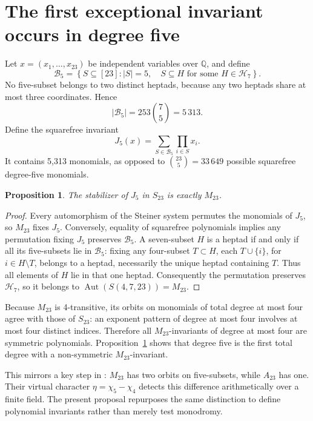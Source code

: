 \documentclass[11pt,letterpaper]{article}
\newtheorem{proposition}[theorem]{Proposition}
\theoremstyle{definition}
\newcommand{\QQ}{\mathbb{Q}}
\newcommand{\Aut}{\operatorname{Aut}}
\newcommand{\B}{\mathcal{B}_5}
\newcommand{\oct}{\mathcal{H}_7}
\begin{document}
\section{The first exceptional invariant occurs in degree five}\label{sec:five}
Let \(x=(x_1,\ldots,x_{23})\) be independent variables over \(\QQ\), and define
\[
\B=\left\{S\subseteq[23]: |S|=5,\quad S\subseteq H\text{ for some }H\in\oct\right\}.
\]
No five-subset belongs to two distinct heptads, because any two heptads share at most three coordinates. Hence
\[
|\B|=253\binom75=5\,313.
\]
Define the squarefree invariant
\begin{equation}\label{eq:J5}
\boxed{\displaystyle J_5(x)=\sum_{S\in\B}\prod_{i\in S}x_i.}
\end{equation}
It contains 5,313 monomials, as opposed to \(\binom{23}{5}=33\,649\) possible squarefree degree-five monomials.

\begin{proposition}\label{prop:stabilizer}
The stabilizer of \(J_5\) in \(S_{23}\) is exactly \(M_{23}\).
\end{proposition}
\begin{proof}
Every automorphism of the Steiner system permutes the monomials of \(J_5\), so \(M_{23}\) fixes \(J_5\). Conversely, equality of squarefree polynomials implies any permutation fixing \(J_5\) preserves \(\B\). A seven-subset \(H\) is a heptad if and only if all its five-subsets lie in \(\B\): fixing any four-subset \(T\subset H\), each \(T\cup\{i\}\), for \(i\in H\setminus T\), belongs to a heptad, necessarily the unique heptad containing \(T\). Thus all elements of \(H\) lie in that one heptad. Consequently the permutation preserves \(\oct\), so it belongs to \(\Aut(S(4,7,23))=M_{23}\).
\end{proof}

Because \(M_{23}\) is 4-transitive, its orbits on monomials of total degree at most four agree with those of \(S_{23}\): an exponent pattern of degree at most four involves at most four distinct indices. Therefore all \(M_{23}\)-invariants of degree at most four are symmetric polynomials. Proposition~\ref{prop:stabilizer} shows that degree five is the first total degree with a non-symmetric \(M_{23}\)-invariant.

This mirrors a key step in \cite[Appendix A, Lemma A.5]{HJLPPZ26}: \(M_{23}\) has two orbits on five-subsets, while \(A_{23}\) has one. Their virtual character \(\eta=\chi_5-\chi_4\) detects this difference arithmetically over a finite field. The present proposal repurposes the same distinction to define polynomial invariants rather than merely test monodromy.
\end{document}
